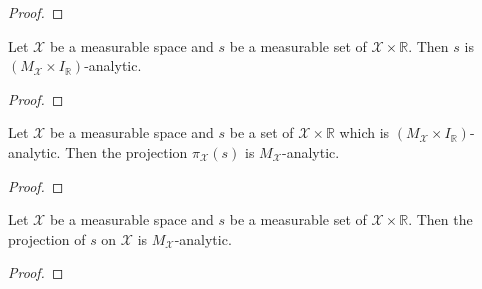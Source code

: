 \begin{proof}\leanok

\end{proof}


\begin{lemma}\label{lem:MeasurableSet.isPavingAnalytic_memProd}
  \leanok
Let $\mathcal{X}$ be a measurable space and $s$ be a measurable set of $\mathcal{X} \times \mathbb{R}$.
Then $s$ is $(M_{\mathcal{X}} \times I_{\mathbb{R}})$-analytic.
\end{lemma}

\begin{proof}\leanok

\end{proof}


\begin{lemma}\label{lem:isPavingAnalytic_fst_of_memProd_measurableSet_Icc}
  \leanok
Let $\mathcal{X}$ be a measurable space and $s$ be a set of $\mathcal{X} \times \mathbb{R}$ which is $(M_{\mathcal{X}} \times I_{\mathbb{R}})$-analytic.
Then the projection $\pi_{\mathcal{X}}(s)$ is $M_{\mathcal{X}}$-analytic.
\end{lemma}

\begin{proof}\leanok

\end{proof}


\begin{lemma}\label{lem:MeasurableSet.isPavingAnalytic_fst}
  \leanok
Let $\mathcal{X}$ be a measurable space and $s$ be a measurable set of $\mathcal{X} \times \mathbb{R}$.
Then the projection of $s$ on $\mathcal{X}$ is $M_{\mathcal{X}}$-analytic.
\end{lemma}

\begin{proof}\leanok

\end{proof}


